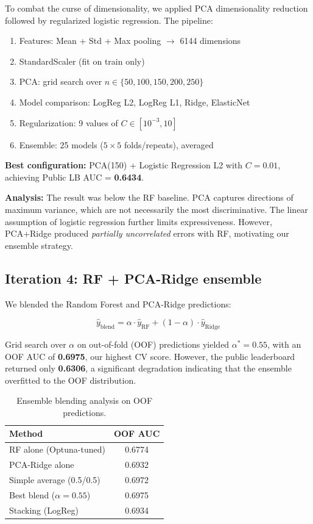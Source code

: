 \documentclass[11pt,a4paper]{article}
\begin{document}
To combat the curse of dimensionality, we applied PCA dimensionality reduction followed by regularized logistic regression. The pipeline:

\begin{enumerate}[nosep]
    \item Features: Mean + Std + Max pooling $\rightarrow$ 6144 dimensions
    \item StandardScaler (fit on train only)
    \item PCA: grid search over $n \in \{50, 100, 150, 200, 250\}$
    \item Model comparison: LogReg L2, LogReg L1, Ridge, ElasticNet
    \item Regularization: 9 values of $C \in [10^{-3}, 10]$
    \item Ensemble: 25 models ($5 \times 5$ folds/repeats), averaged
\end{enumerate}

\textbf{Best configuration:} PCA(150) + Logistic Regression L2 with $C=0.01$, achieving Public LB AUC = \textbf{0.6434}.

\textbf{Analysis:} The result was below the RF baseline. PCA captures directions of maximum variance, which are not necessarily the most discriminative. The linear assumption of logistic regression further limits expressiveness. However, PCA+Ridge produced \emph{partially uncorrelated} errors with RF, motivating our ensemble strategy.

\subsection{Iteration 4: RF + PCA-Ridge ensemble}

We blended the Random Forest and PCA-Ridge predictions:

\begin{equation}
    \hat{y}_{\text{blend}} = \alpha \cdot \hat{y}_{\text{RF}} + (1 - \alpha) \cdot \hat{y}_{\text{Ridge}}
\end{equation}

Grid search over $\alpha$ on out-of-fold (OOF) predictions yielded $\alpha^* = 0.55$, with an OOF AUC of \textbf{0.6975}, our highest CV score. However, the public leaderboard returned only \textbf{0.6306}, a significant degradation indicating that the ensemble overfitted to the OOF distribution.

\begin{table}[H]
    \centering
    \caption{Ensemble blending analysis on OOF predictions.}
    \begin{tabular}{lc}
        \toprule
        \textbf{Method} & \textbf{OOF AUC} \\
        \midrule
        RF alone (Optuna-tuned) & 0.6774 \\
        PCA-Ridge alone         & 0.6932 \\
        Simple average (0.5/0.5) & 0.6972 \\
        Best blend ($\alpha = 0.55$) & 0.6975 \\
        Stacking (LogReg)        & 0.6934 \\
        \bottomrule
    \end{tabular}
    \label{tab:ensemble_oof}
\end{table}
\end{document}

